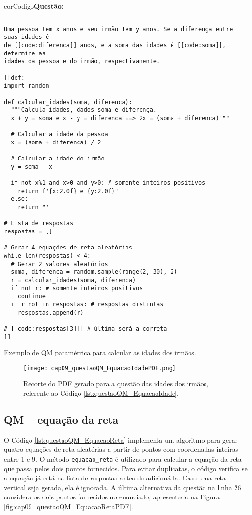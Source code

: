 \begin{listing}[!ht]
\begin{myboxCode}{corCodigo}{\textbf{Questão: }}\vspace{3mm}
\hrule
\begin{verbatim}
Uma pessoa tem x anos e seu irmão tem y anos. Se a diferença entre suas idades é 
de [[code:diferenca]] anos, e a soma das idades é [[code:soma]], determine as 
idades da pessoa e do irmão, respectivamente. 

[[def: 
import random

def calcular_idades(soma, diferenca):
  """Calcula idades, dados soma e diferença.
  x + y = soma e x - y = diferenca ==> 2x = (soma + diferenca)"""

  # Calcular a idade da pessoa
  x = (soma + diferenca) / 2

  # Calcular a idade do irmão
  y = soma - x

  if not x%1 and x>0 and y>0: # somente inteiros positivos
    return f"{x:2.0f} e {y:2.0f}"
  else:
    return ""

# Lista de respostas
respostas = []

# Gerar 4 equações de reta aleatórias
while len(respostas) < 4:
  # Gerar 2 valores aleatórios
  soma, diferenca = random.sample(range(2, 30), 2)
  r = calcular_idades(soma, diferenca)
  if not r: # somente inteiros positivos
    continue
  if r not in respostas: # respostas distintas
    respostas.append(r)
    
# [[code:respostas[3]]] # última será a correta
]]
\end{verbatim}
\end{myboxCode}
\caption{Exemplo de QM paramétrica para calcular as idades dos irmãos.}
\label{lst:questaoQM_EquacaoIdade}
\end{listing}

\begin{figure}[!ht]
  \texttt{[image: cap09\_questaoQM\_EquacaoIdadePDF.png]}
  \caption{Recorte do PDF gerado para a questão das idades dos irmãos, referente ao Código \ref{lst:questaoQM_EquacaoIdade}.}
  \label{fig:cap09_questaoQM_EquacaoIdadePDFb}
\end{figure}

\subsection{QM -- equação da reta}

O Código \ref{lst:questaoQM_EquacaoReta} implementa um algoritmo para gerar quatro equações de reta aleatórias a partir de pontos com coordenadas inteiras entre 1 e 9. O método \verb|equacao_reta| é utilizado para calcular a equação da reta que passa pelos dois pontos fornecidos. Para evitar duplicatas, o código verifica se a equação já está na lista de respostas antes de adicioná-la. Caso uma reta vertical seja gerada, ela é ignorada. A última alternativa da questão na linha 26 considera os dois pontos fornecidos no enunciado, apresentado na Figura \ref{fig:cap09_questaoQM_EquacaoRetaPDF}.

